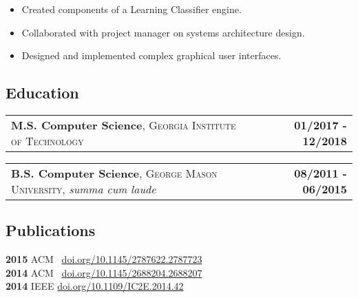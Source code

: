 \documentclass[10pt,letterpaper]{article}
\newenvironment{details}
{\begin{itemize}}
{\end{itemize}}
\begin{document}
\begin{details}
\item Created components of a Learning Classifier engine.
\item Collaborated with project manager on systems architecture design.
\item Designed and implemented complex graphical user interfaces.
\end{details}


\subsection{Education}

\noindent
\begin{tabularx}{\textwidth}{@{}X r@{}}
  \textbf{M.S. Computer Science}, \textsc{Georgia Institute of Technology} & \textbf{01/2017 - 12/2018}
\end{tabularx}

\noindent
\begin{tabularx}{\textwidth}{@{}X r@{}}
  \textbf{B.S. Computer Science}, \textsc{George Mason University}, \emph{summa cum laude} & \textbf{08/2011 - 06/2015}
\end{tabularx}


\subsection{Publications}

\noindent
\textbf{2015} ACM \ \href{https://doi.org/10.1145/2787622.2787723}{doi.org/10.1145/2787622.2787723} \\
\textbf{2014} ACM \ \href{https://doi.org/10.1145/2688204.2688207}{doi.org/10.1145/2688204.2688207} \\
\textbf{2014} IEEE  \href{https://doi.org/10.1109/IC2E.2014.42}{doi.org/10.1109/IC2E.2014.42}
\end{document}
